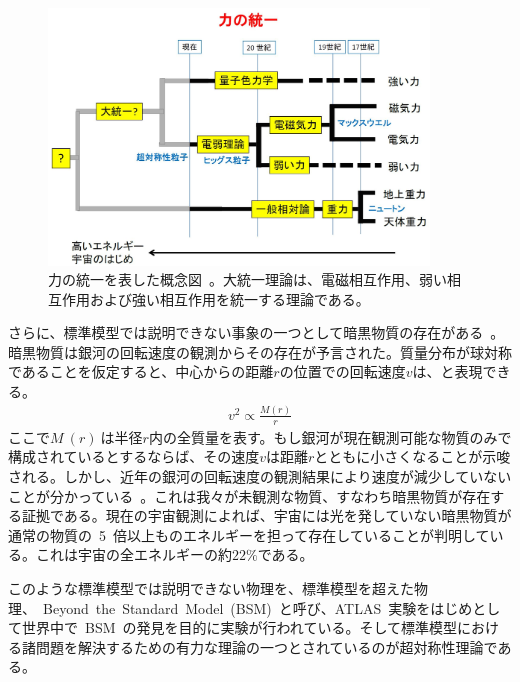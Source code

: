 \begin{figure}[tb]
        \centering   
        \includegraphics[width=0.9\textwidth]{img/jpeg/physics_bsm_05.jpg}
        \caption[力の統一を表した概念図]{力の統一を表した概念図~\cite{URL:01}。大統一理論は、電磁相互作用、弱い相互作用および強い相互作用を統一する理論である。}\label{fig:gut}
\end{figure}


さらに、標準模型では説明できない事象の一つとして暗黒物質の存在がある~\cite{AR:11}。暗黒物質は銀河の回転速度の観測からその存在が予言された。質量分布が球対称であることを仮定すると、中心からの距離$r$の位置での回転速度$v$は、と表現できる。
\begin{align}
    v^2\propto\frac{M(r)}{r} \label{eq:dark}
\end{align}
ここで$M~(r)~$は半径$r$内の全質量を表す。もし銀河が現在観測可能な物質のみで構成されているとするならば、その速度$v$は距離$r$とともに小さくなることが示唆される。しかし、近年の銀河の回転速度の観測結果により速度が減少していないことが分かっている~\cite{AR:16}。これは我々が未観測な物質、すなわち暗黒物質が存在する証拠である。現在の宇宙観測によれば、宇宙には光を発していない暗黒物質が通常の物質の~5~倍以上ものエネルギーを担って存在していることが判明している。これは宇宙の全エネルギーの約$22\%$である。

このような標準模型では説明できない物理を、標準模型を超えた物理、~Beyond~the~Standard~Model~(BSM)~と呼び、ATLAS~実験をはじめとして世界中で~BSM~の発見を目的に実験が行われている。そして標準模型における諸問題を解決するための有力な理論の一つとされているのが超対称性理論である。

